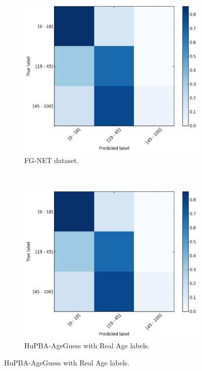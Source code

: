 \begin{figure}[!h]
	\centering
	\begin{subfigure}[b]{0.5\textwidth}
		\includegraphics[width=\textwidth]{figures/FG-NETconf_mat}
		\caption{FG-NET dataset.}
		\label{fig:cmfgnet}
	\end{subfigure}%
	~
	\begin{subfigure}[b]{0.5\textwidth}
		\includegraphics[width=\textwidth]{figures/FG-NETconf_mat}
		\captionsetup{width=1.1\textwidth}
		\caption{HuPBA-AgeGuess with Real Age labels.}
		\label{fig:cmreal}
	\end{subfigure} %
	

\end{figure}
